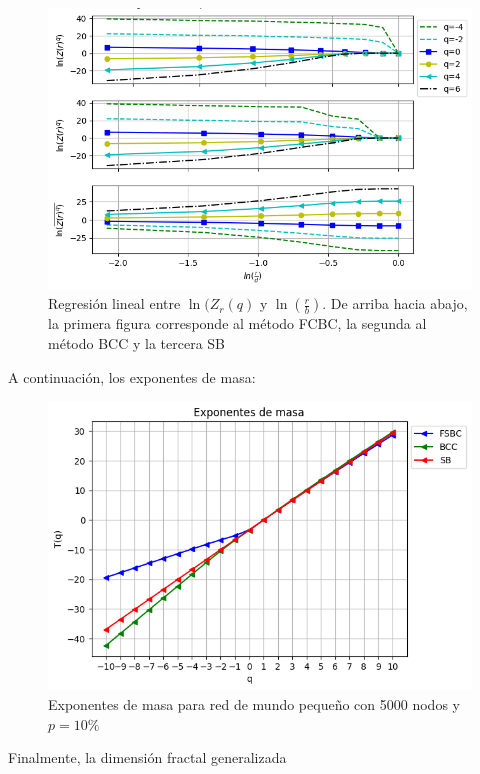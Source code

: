 \begin{figure}[H]
    \centering
    \includegraphics[scale=0.7]{Capitulo4Multifractalidad/imagenes/a_TqLnrBCsmallWorld4000p10.png}
    \caption{Regresión lineal entre $\ln(Z_r(q)$ y $\ln(\frac{r}{b})$. De arriba hacia abajo, la primera figura corresponde al método FCBC, la segunda al método BCC y la tercera SB}
\end{figure}

A continuación, los exponentes de masa:


\begin{figure}[H]
    \centering
    \includegraphics[scale=0.7]{Capitulo4Multifractalidad/imagenes/a_TqsmallWorld4000p10.png}
    \caption{Exponentes de masa para red de mundo pequeño con 5000 nodos y $p=10\%$}
\end{figure}

Finalmente, la dimensión fractal generalizada


